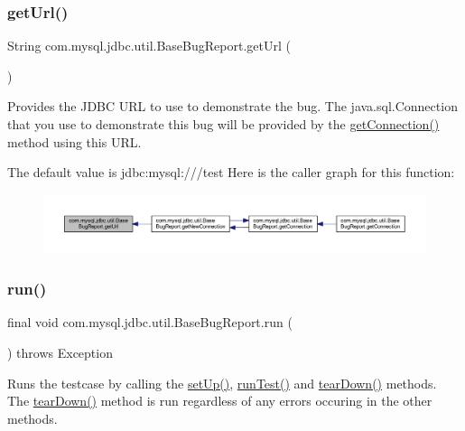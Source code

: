 \subsubsection{\texorpdfstring{get\+Url()}{getUrl()}}
{\footnotesize\ttfamily String com.\+mysql.\+jdbc.\+util.\+Base\+Bug\+Report.\+get\+Url (\begin{DoxyParamCaption}{ }\end{DoxyParamCaption})}

Provides the J\+D\+BC U\+RL to use to demonstrate the bug. The java.\+sql.\+Connection that you use to demonstrate this bug will be provided by the \mbox{\hyperlink{classcom_1_1mysql_1_1jdbc_1_1util_1_1_base_bug_report_a71060585627222c1d40f6cae3b2e9542}{get\+Connection()}} method using this U\+RL.

The default value is \textquotesingle{}jdbc\+:mysql\+:///test\textquotesingle{} Here is the caller graph for this function\+:
\nopagebreak
\begin{figure}[H]
\begin{center}
\leavevmode
\includegraphics[width=350pt]{classcom_1_1mysql_1_1jdbc_1_1util_1_1_base_bug_report_a99f7e2402d349f45c11a4cd09ba4f62a_icgraph}
\end{center}
\end{figure}
\mbox{\label{classcom_1_1mysql_1_1jdbc_1_1util_1_1_base_bug_report_ab8d6a080a34fed2a99c651d1d5870eb1}} 
\subsubsection{\texorpdfstring{run()}{run()}}
{\footnotesize\ttfamily final void com.\+mysql.\+jdbc.\+util.\+Base\+Bug\+Report.\+run (\begin{DoxyParamCaption}{ }\end{DoxyParamCaption}) throws Exception}

Runs the testcase by calling the \mbox{\hyperlink{classcom_1_1mysql_1_1jdbc_1_1util_1_1_base_bug_report_aad06cc210e16377a2837266b087ea2ce}{set\+Up()}}, \mbox{\hyperlink{classcom_1_1mysql_1_1jdbc_1_1util_1_1_base_bug_report_ad870550c2d0f04bc0286066d8d8ebe5f}{run\+Test()}} and \mbox{\hyperlink{classcom_1_1mysql_1_1jdbc_1_1util_1_1_base_bug_report_a7fd16c03e3e8778c75cb64274e1349de}{tear\+Down()}} methods. The \mbox{\hyperlink{classcom_1_1mysql_1_1jdbc_1_1util_1_1_base_bug_report_a7fd16c03e3e8778c75cb64274e1349de}{tear\+Down()}} method is run regardless of any errors occuring in the other methods.


